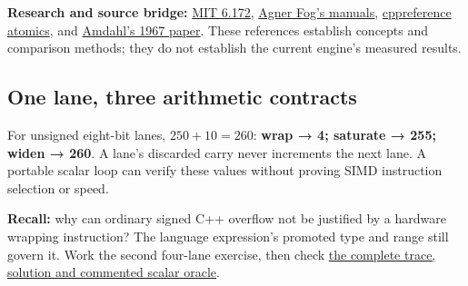 \textbf{Research and source bridge:} \href{https://ocw.mit.edu/courses/6-172-performance-engineering-of-software-systems-fall-2018/video_galleries/lecture-videos/}{MIT 6.172}, \href{https://www.agner.org/optimize/}{Agner Fog's manuals}, \href{https://en.cppreference.com/w/cpp/atomic/memory_order}{cppreference atomics}, and \href{https://doi.org/10.1145/1465482.1465560}{Amdahl's 1967 paper}. These references establish concepts and comparison methods; they do not establish the current engine's measured results.

\subsection{One lane, three arithmetic contracts}\label{appendix-2587680a4fe3-one-lane-three-arithmetic-contracts}

\hypertarget{appendix-2587680a4fe3-one-lane-three-arithmetic-contracts}{}

For unsigned eight-bit lanes, \(250+10=260\): \textbf{wrap → 4; saturate → 255; widen → 260}. A lane's discarded carry never increments the next lane. A portable scalar loop can verify these values without proving SIMD instruction selection or speed.

\textbf{Recall:} why can ordinary signed C++ overflow not be justified by a hardware wrapping instruction? The language expression's promoted type and range still govern it. Work the second four-lane exercise, then check \hyperref[01-foundations-i-ch007-three-lane-arithmetic-contracts-wrap-saturate-and-widen]{the complete trace, solution and commented scalar oracle}.
